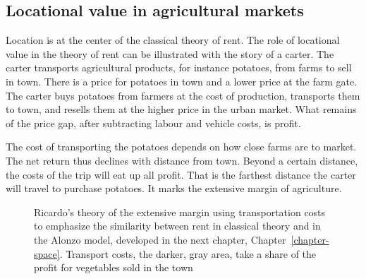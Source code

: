 
\subsection{Locational value in agricultural markets}
Location is at the center of the classical theory of rent. The role of locational value in the theory of \gls{rent} can be illustrated with the story of a carter. The carter transports agricultural products, for instance potatoes, from farms to sell in town. %
There is a price for potatoes in town and a lower price at the farm gate. The carter buys potatoes from farmers at the cost of production, transports them to town, and resells them at the higher price in the urban market. What remains of the price gap, after subtracting labour and vehicle costs, is profit. %

The cost of transporting the potatoes depends on how close farms are to market.  
The net return thus declines with distance from town. Beyond a certain distance, the costs of the trip will eat up all profit. That is the farthest distance the carter will travel to purchase potatoes. It marks the \gls{extensive margin} of agriculture. 

\begin{figure}[htb]
\begin{center}
    
\caption[Ricardo's theory of extensive margin.]{Ricardo's theory of the extensive margin using transportation costs to emphasize the similarity between rent in classical theory and in the Alonzo model, developed in the next chapter, Chapter~\ref{chapter-space}. Transport costs, the darker, gray area, take a share of the profit for vegetables sold in the town}
\label{fig-rent-ricardo}
\end{center}
\end{figure}


